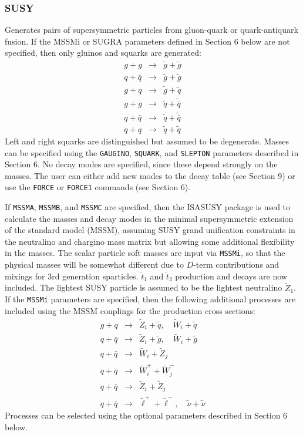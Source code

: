 \subsubsection{SUSY} Generates pairs of supersymmetric particles from
gluon-quark or quark-antiquark fusion. If the MSSMi or SUGRA parameters
defined in Section 6 below are not specified, then only gluinos and
squarks are generated:
\begin{eqnarray*}
g + g      &\to& \tilde g + \tilde g \\
q + \bar q &\to& \tilde g + \tilde g \\
g + q      &\to& \tilde g + \tilde q \\
g + g      &\to& \tilde q + \tilde{\bar q} \\
q + \bar q &\to& \tilde q + \tilde{\bar q} \\
q + q      &\to& \tilde q + \tilde q
\end{eqnarray*}
Left and right squarks are distinguished but assumed to be degenerate.
Masses can be specified using the \verb|GAUGINO|, \verb|SQUARK|, and
\verb|SLEPTON| parameters described in Section 6. No decay modes are
specified, since these depend strongly on the masses. The user can
either add new modes to the decay table (see Section 9) or use the
\verb|FORCE| or \verb|FORCE1| commands (see Section 6).

      If \verb|MSSMA|, \verb|MSSMB|, and \verb|MSSMC| are specified,
then the ISASUSY package is used to calculate the masses and decay
modes in the minimal supersymmetric extension of the standard model
(MSSM), assuming SUSY grand unification constraints in the neutralino
and chargino mass matrix but allowing some additional flexibility in
the masses. The scalar particle soft masses are input via
\verb|MSSMi|, so that the physical masses will be somewhat different
due to $D$-term contributions and mixings for 3rd generation sparticles.
$\tilde t_1$ and $\tilde t_2$ production and decays are now included.
The lightest SUSY particle is assumed to be the lightest neutralino
$\tilde Z_1$. If the \verb|MSSMi| parameters are specified, then the
following additional processes are included using the MSSM couplings
for the production cross sections:
\begin{eqnarray*}
g + q    &\to& \tilde Z_i + \tilde q, \quad \tilde W_i + \tilde q \\
q + \bar q &\to& \tilde Z_i + \tilde g, \quad \tilde W_i + \tilde g \\
q + \bar q &\to& \tilde W_i + \tilde Z_j \\
q + \bar q &\to& \tilde W_i^+ + \tilde W_j^- \\
q + \bar q &\to& \tilde Z_i + \tilde Z_j \\
q + \bar q &\to& \tilde\ell^+ + \tilde\ell^-, \quad \tilde\nu + \tilde\nu
\end{eqnarray*}
Processes can be selected using the optional parameters described in
Section 6 below.

